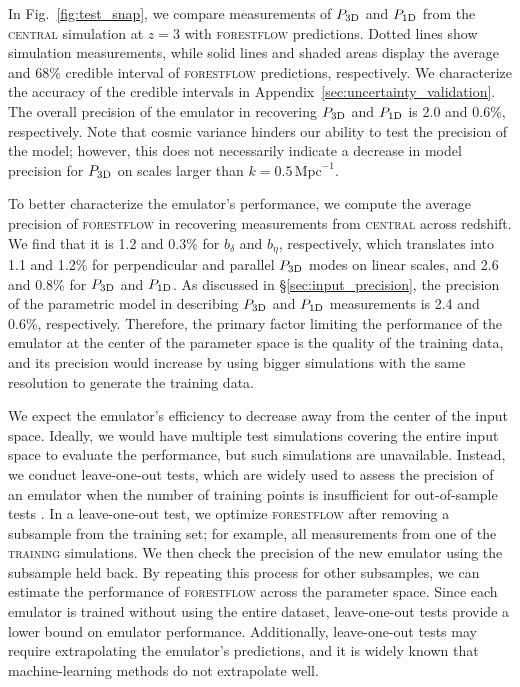 \documentclass[fleqn,usenatbib]{mnras}
\newcommand{\poned}{\ensuremath{P_{\rm 1D}}\xspace}
\newcommand{\pthreed}{\ensuremath{P_{\rm 3D}}\xspace}
\newcommand{\forestflow}{\textsc{forestflow}\xspace}
\newcommand{\lacehc}{\textsc{training}\xspace}
\newcommand{\simcentral}{\textsc{central}\xspace}
\newcommand{\iMpc}{\ensuremath{\,\mathrm{Mpc}^{-1}}}
\begin{document}
In Fig.~\ref{fig:test_snap}, we compare measurements of \pthreed and \poned from the \simcentral simulation at $z=3$ with \forestflow predictions. Dotted lines show simulation measurements, while solid lines and shaded areas display the average and 68\% credible interval of \forestflow predictions, respectively. We characterize the accuracy of the credible intervals in Appendix~\ref{sec:uncertainty_validation}. The overall precision of the emulator in recovering \pthreed and \poned is 2.0 and 0.6\%, respectively. Note that cosmic variance hinders our ability to test the precision of the model; however, this does not necessarily indicate a decrease in model precision for \pthreed on scales larger than $k=0.5\iMpc$.

To better characterize the emulator's performance, we compute the average precision of \forestflow in recovering measurements from \simcentral across redshift. We find that it is 1.2 and 0.3\% for $b_\delta$ and $b_\eta$, respectively, which translates into 1.1 and 1.2\% for perpendicular and parallel \pthreed modes on linear scales, and 2.6 and 0.8\% for \pthreed and \poned. As discussed in \S\ref{sec:input_precision}, the precision of the parametric model in describing \pthreed and \poned measurements is 2.4 and 0.6\%, respectively. Therefore, the primary factor limiting the performance of the emulator at the center of the parameter space is the quality of the training data, and its precision would increase by using bigger simulations with the same resolution to generate the training data.

We expect the emulator's efficiency to decrease away from the center of the input space. Ideally, we would have multiple test simulations covering the entire input space to evaluate the performance, but such simulations are unavailable. Instead, we conduct leave-one-out tests, which are widely used to assess the precision of an emulator when the number of training points is insufficient for out-of-sample tests \citep[e.g.;][]{hastie01statisticallearning}. In a leave-one-out test, we optimize \forestflow after removing a subsample from the training set; for example, all measurements from one of the \lacehc simulations. We then check the precision of the new emulator using the subsample held back. By repeating this process for other subsamples, we can estimate the performance of \forestflow across the parameter space. Since each emulator is trained without using the entire dataset, leave-one-out tests provide a lower bound on emulator performance. Additionally, leave-one-out tests may require extrapolating the emulator's predictions, and it is widely known that machine-learning methods do not extrapolate well.
\end{document}
